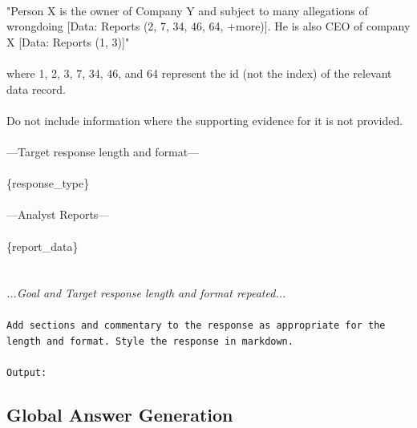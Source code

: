 \documentclass{article}
\begin{document}
{\\
"Person X is the owner of Company Y and subject to many allegations of wrongdoing [Data: Reports (2, 7, 34, 46, 64, +more)]. He is also CEO of company X [Data: Reports (1, 3)]"\\
\\
where 1, 2, 3, 7, 34, 46, and 64 represent the id (not the index) of the relevant data record.\\
\\
Do not include information where the supporting evidence for it is not provided.\\
\\
---Target response length and format---\\
\\
\{response\_type\}\\
\\
---Analyst Reports---\\
\\
\{report\_data\}\\
\\}
\textit{\\
...Goal and Target response length and format repeated...\\
\\}
\texttt{Add sections and commentary to the response as appropriate for the length and format. Style the response in markdown.\\
\\
Output:}

\subsection{Global Answer Generation}
\end{document}
